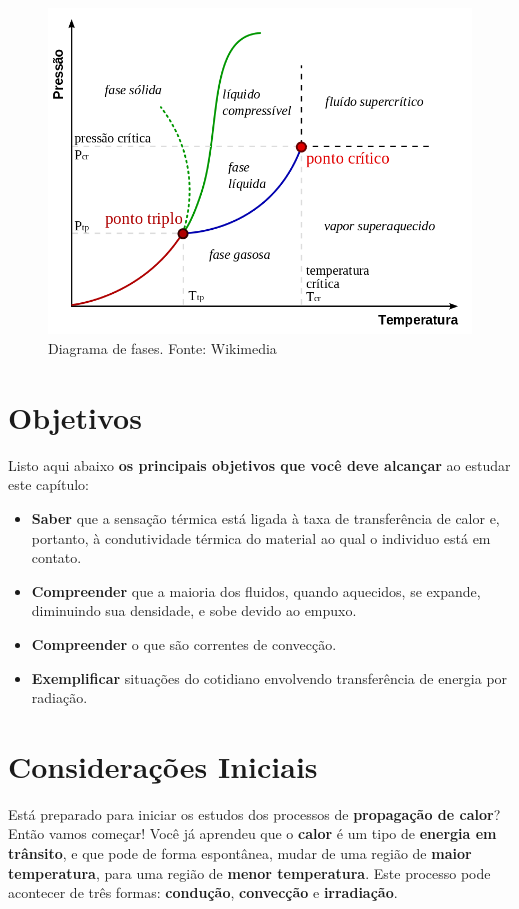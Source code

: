 \documentclass[12pt,twoside]{article}
\begin{document}
\begin{figure}[ht]{}
\centering\includegraphics[width=2.5truein]{ponto-triplo.png}
\caption{Diagrama de fases. Fonte: Wikimedia}

\end{figure}

\hypertarget{x-objetivos}{\section{Objetivos}}
Listo aqui abaixo \textbf{os principais objetivos que você deve alcançar} ao estudar este capítulo:


\begin{itemize}

\item \textbf{Saber} que a sensação térmica está ligada à taxa de  transferência de calor e, portanto, à condutividade térmica do material ao qual o individuo está em contato.

\item \textbf{Compreender} que a maioria dos fluidos, quando aquecidos, se expande, diminuindo sua densidade, e sobe devido ao empuxo.

\item \textbf{Compreender} o que são correntes de convecção.

\item \textbf{Exemplificar} situações do cotidiano envolvendo transferência de energia por radiação.

\end{itemize}


\hypertarget{x-considerações-iniciais}{\section{Considerações Iniciais}}
Está preparado para iniciar os estudos dos processos de \textbf{propagação de calor}? Então vamos começar! Você já aprendeu que o \textbf{calor} é um tipo de \textbf{energia em trânsito}, e que pode de forma espontânea, mudar de uma região de \textbf{maior temperatura}, para uma região de \textbf{menor temperatura}. Este processo pode acontecer de três formas: \textbf{condução}, \textbf{convecção} e \textbf{irradiação}.
\end{document}
